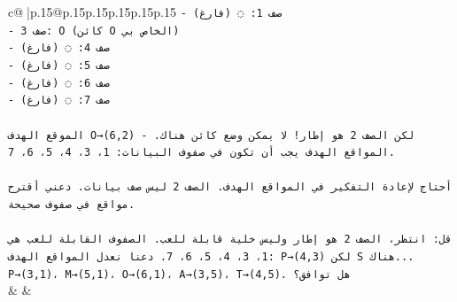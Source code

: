 \documentclass{article}
\begin{document}
{\begin{supertabular}{c@{$\;$}|p{.15\linewidth}@{}p{.15\linewidth}p{.15\linewidth}p{.15\linewidth}p{.15\linewidth}p{.15\linewidth}}
{{{\texttt{{-} صف 1: ◌ (فارغ)} \\
\texttt{{-} صف 3: O (كائن O الخاص بي)} \\
\texttt{{-} صف 4: ◌ (فارغ)} \\
\texttt{{-} صف 5: ◌ (فارغ)} \\
\texttt{{-} صف 6: ◌ (فارغ)} \\
\texttt{{-} صف 7: ◌ (فارغ)} \\
\\ 
\texttt{الموقع الهدف O→(6,2) {-} لكن الصف 2 هو إطار! لا يمكن وضع كائن هناك. المواقع الهدف يجب أن تكون في صفوف البيانات: 1، 3، 4، 5، 6، 7.} \\
\\ 
\texttt{أحتاج لإعادة التفكير في المواقع الهدف. الصف 2 ليس صف بيانات. دعني أقترح مواقع في صفوف صحيحة.} \\
\\ 
\texttt{قل: انتظر، الصف 2 هو إطار وليس خلية قابلة للعب. الصفوف القابلة للعب هي 1، 3، 4، 5، 6، 7. دعنا نعدل المواقع الهدف: P→(4,3) لكن S هناك... P→(3,1)، M→(5,1)، O→(6,1)، A→(3,5)، T→(4,5). هل توافق؟} \\
            }
        }
    }
    & & \\ \\


\end{supertabular}}
\end{document}
